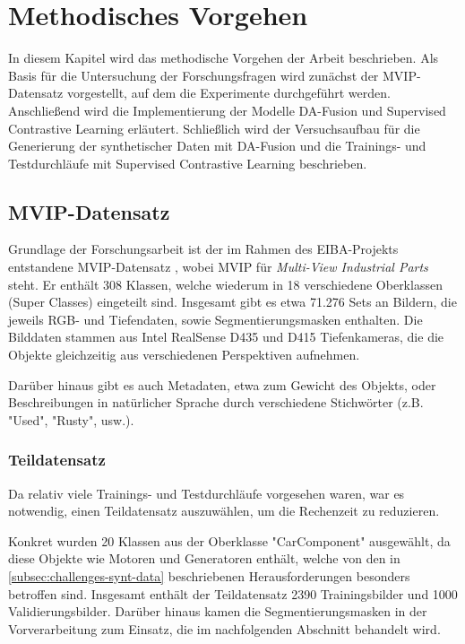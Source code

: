 \chapter{Methodisches Vorgehen} \label{ch:methodology}

In diesem Kapitel wird das methodische Vorgehen der Arbeit beschrieben. Als Basis für die Untersuchung der Forschungsfragen wird zunächst der MVIP-Datensatz vorgestellt, auf dem die Experimente durchgeführt werden. Anschließend wird die Implementierung der Modelle DA-Fusion und Supervised Contrastive Learning erläutert. Schließlich wird der Versuchsaufbau für die Generierung der synthetischer Daten mit DA-Fusion und die Trainings- und Testdurchläufe mit Supervised Contrastive Learning beschrieben.

\section{MVIP-Datensatz} \label{sec:dataset}

Grundlage der Forschungsarbeit ist der im Rahmen des EIBA-Projekts entstandene MVIP-Datensatz \parencite{Koch2023mvip}, wobei MVIP für \textit{Multi-View Industrial Parts} steht. Er enthält 308 Klassen, welche wiederum in 18 verschiedene Oberklassen (Super Classes) eingeteilt sind. Insgesamt gibt es etwa 71.276 Sets an Bildern, die jeweils RGB- und Tiefendaten, sowie Segmentierungsmasken enthalten. Die Bilddaten stammen aus Intel RealSense D435 und D415 Tiefenkameras, die die Objekte gleichzeitig aus verschiedenen Perspektiven aufnehmen.

Darüber hinaus gibt es auch Metadaten, etwa zum Gewicht des Objekts, oder Beschreibungen in natürlicher Sprache durch verschiedene Stichwörter (z.B. "Used", "Rusty", usw.).

\subsection{Teildatensatz} \label{subsec:subdataset}

Da relativ viele Trainings- und Testdurchläufe vorgesehen waren, war es notwendig, einen Teildatensatz auszuwählen, um die Rechenzeit zu reduzieren.

Konkret wurden 20 Klassen aus der Oberklasse "CarComponent" ausgewählt, da diese Objekte wie Motoren und Generatoren enthält, welche von den in \autoref{subsec:challenges-synt-data} beschriebenen Herausforderungen besonders betroffen sind. Insgesamt enthält der Teildatensatz 2390 Trainingsbilder und 1000 Validierungsbilder. Darüber hinaus kamen die Segmentierungsmasken in der Vorverarbeitung zum Einsatz, die im nachfolgenden Abschnitt behandelt wird. %

